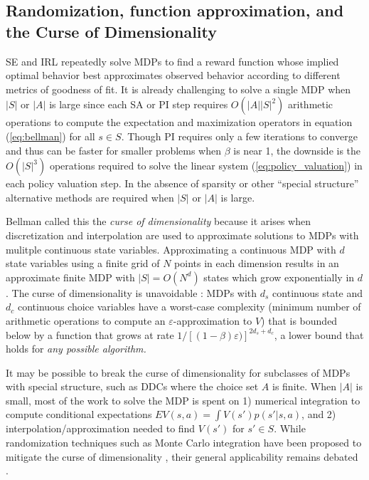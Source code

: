 \subsection{Randomization, function approximation, and the Curse of Dimensionality}
\label{section:curse}

SE and IRL repeatedly solve MDPs to find a reward function whose implied optimal behavior
best approximates observed behavior according to different metrics of goodness of fit. 
It is already challenging to solve a single MDP when $|S|$ or $|A|$ is large since each SA
or PI step requires $O(|A||S|^2)$ arithmetic operations to compute the expectation and maximization operators 
in equation (\ref{eq:bellman}) for all $s \in S$. Though PI requires only a few iterations to converge and thus
can be faster for smaller problems when $\beta$ is near 1, the downside is the $O(|S|^3)$ operations
required to solve the linear system (\ref{eq:policy_valuation}) in each policy valuation step.
In the absence of sparsity or other ``special structure'' alternative methods are required when $|S|$ or $|A|$ is large.

Bellman called this  the {\it curse of dimensionality\/} because it arises 
when  discretization and interpolation are used to approximate solutions to MDPs with mulitple continuous state variables. 
Approximating a continuous MDP with $d$ state variables using a finite grid of $N$ points in each dimension 
results in an approximate finite MDP with $|S|=O(N^d)$ states which grow exponentially in $d$. The curse of dimensionality is unavoidable \citep{CT:1989}:  MDPs with $d_s$ continuous state and $d_c$ continuous choice variables
have a worst-case complexity (minimum number of arithmetic operations to compute an $\varepsilon$-approximation to $V$) 
that is bounded below by a function that grows at rate  $1/[(1-\beta)\varepsilon)]^{2d_s+d_c}$, a  lower bound that holds for {\it any possible 
algorithm.\/}

It may be possible to break the curse of dimensionality for subclasses of MDPs with special structure, such as  DDCs 
where the choice set $A$ is finite. When $|A|$ is small, most of the work to solve the MDP is spent on 1) numerical integration to
compute conditional expectations $EV(s,a)=\int V(s')p(s'|s,a)$, and 2) interpolation/approximation needed to find $V(s')$ for $s' \in S$.
While randomization techniques such as Monte Carlo integration have been proposed to mitigate the curse of dimensionality \citep{rust:1997}, their general applicability remains debated \citep{bray:2022}.

